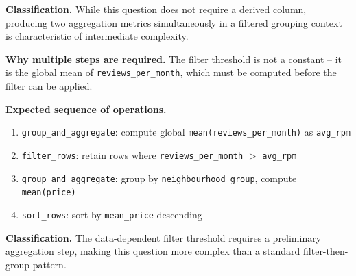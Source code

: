 \textbf{Classification.}
While this question does not require a derived column, producing two aggregation metrics simultaneously in a filtered grouping context is characteristic of intermediate complexity.



\textbf{Why multiple steps are required.}
The filter threshold is not a constant -- it is the global mean of \texttt{reviews\_per\_month}, which must be computed before the filter can be applied.

\textbf{Expected sequence of operations.}
\begin{enumerate}
  \item \texttt{group\_and\_aggregate}: compute global
    \texttt{mean(reviews\_per\_month)} as \texttt{avg\_rpm}
  \item \texttt{filter\_rows}: retain rows where \texttt{reviews\_per\_month}
    $>$ \texttt{avg\_rpm}
  \item \texttt{group\_and\_aggregate}: group by \texttt{neighbourhood\_group},
    compute \texttt{mean(price)}
  \item \texttt{sort\_rows}: sort by \texttt{mean\_price} descending
\end{enumerate}

\textbf{Classification.}
The data-dependent filter threshold requires a preliminary aggregation step, making this question more complex than a standard filter-then-group pattern.
